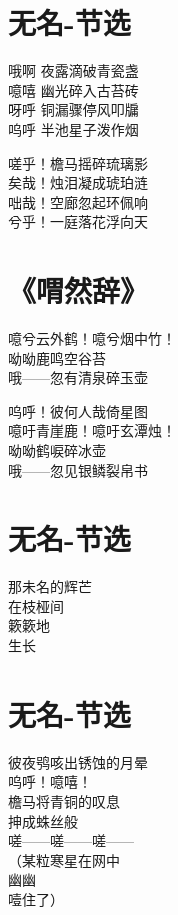 \clearpage


\section{无名-节选}

哦啊 夜露滴破青瓷盏 \\
噫嘻 幽光碎入古苔砖 \\
呀呼 铜漏骤停风叩牖 \\
呜呼 半池星子泼作烟
\vspace{1em}

嗟乎！檐马摇碎琉璃影 \\
矣哉！烛泪凝成琥珀涟 \\
咄哉！空廊忽起环佩响 \\
兮乎！一庭落花浮向天

\clearpage


\section{《喟然辞》}

噫兮云外鹤！噫兮烟中竹！ \\
呦呦鹿鸣空谷苔 \\
哦——忽有清泉碎玉壶
\vspace{1em}

呜呼！彼何人哉倚星图 \\
噫吁青崖鹿！噫吁玄潭烛！ \\
呦呦鹤唳碎冰壶 \\
哦——忽见银鳞裂帛书

\clearpage


\section{无名-节选}

那未名的辉芒 \\
在枝桠间 \\
簌簌地 \\
生长

\clearpage


\section{无名-节选}

彼夜鸮咳出锈蚀的月晕 \\
呜呼！噫嘻！ \\
檐马将青铜的叹息 \\
抻成蛛丝般 \\
嗟——嗟——嗟—— \\
（某粒寒星在网中 \\
幽幽 \\
噎住了）


